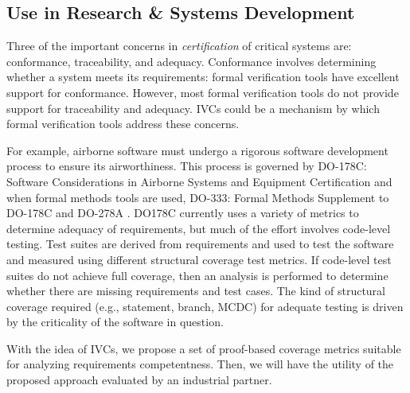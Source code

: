 \subsection{Use in Research \& Systems Development}

Three of the important concerns in \emph{certification} of critical systems are: conformance, traceability, and adequacy.  Conformance involves determining whether a system meets its requirements: formal verification tools have excellent support for conformance.  However, most formal verification tools do not provide support for traceability and adequacy.  IVCs could be a mechanism by which formal verification tools address these concerns.

For example, airborne software must undergo a rigorous software development process to ensure its airworthiness. This process is governed by DO-178C: Software Considerations in Airborne Systems and Equipment Certification and when formal methods tools are used, DO-333: Formal Methods Supplement to DO-178C and DO-278A \cite{DO178C}.
DO178C currently uses a variety of metrics to determine adequacy of requirements, but much of the effort involves code-level testing.  Test suites are derived from requirements and used to test the software and measured using different structural coverage test metrics.  If code-level test suites do not achieve full coverage, then an analysis is performed to determine whether there are missing requirements and test cases.  The kind of structural coverage required (e.g., statement, branch, MCDC) for adequate testing is driven by the criticality of the software in question.

With the idea of IVCs, we propose a set of proof-based coverage metrics suitable for analyzing requirements competentness. Then, we will have the utility of the proposed approach evaluated by an industrial partner.


